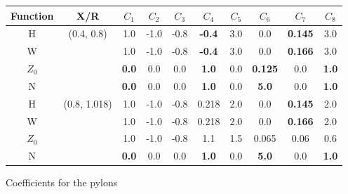 \documentclass[12pt]{article}
\begin{document}
\begin{figure} \begin{centering}
\begin{small}
\begin{tabular}{cccccccccc}
Function & X/R & $C_{1}$ & $C_{2}$ & $C_{3}$ & $C_{4}$ & $C_{5}$ & $C_{6}$ & $C_{7}$ & $C_{8}$ \\
\hline
H          & (0.4, 0.8)  & 1.0             & -1.0 & -0.8 & \textbf{-0.4} & 3.0 & 0.0                  & \textbf{0.145} & 3.0 \\
W          &                 & 1.0             & -1.0 & -0.8 & \textbf{-0.4} & 3.0 & 0.0                  & \textbf{0.166} & 3.0 \\
$Z_{0}$ &                 & \textbf{0.0} & 0.0  & 0.0  & \textbf{1.0}  & 0.0  & \textbf{0.125} & 0.0                 & \textbf{1.0} \\
N           &                 & \textbf{0.0} & 0.0  & 0.0  & \textbf{1.0}  & 0.0  & \textbf{5.0}     & 0.0                 & \textbf{1.0} \\
\hline
H          & (0.8, 1.018)  & 1.0             & -1.0 & -0.8 & 0.218         & 2.0 & 0.0                 & \textbf{0.145} & 2.0 \\
W          &                     & 1.0             & -1.0 & -0.8 & 0.218         & 2.0 & 0.0                 & \textbf{0.166} & 2.0 \\
$Z_{0}$ &                     & 1.0             & -1.0 & -0.8 & 1.1             & 1.5 & 0.065             & 0.06               & 0.6 \\
N           &                     & \textbf{0.0} & 0.0  & 0.0  & \textbf{1.0} & 0.0 & \textbf{5.0}     & 0.0                 & \textbf{1.0} \\
\end{tabular}
\caption{Coefficients for the pylons}
\label{pycoeff}
\end{small}
\end{centering}\end{figure}%



\end{document}

